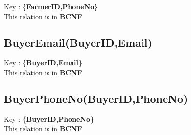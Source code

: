\documentclass{article}
\begin{document}
Key : \textbf{\{FarmerID,PhoneNo\}}\\
This relation is in \textbf{BCNF}
 
\subsection*{BuyerEmail(BuyerID,Email)}

Key : \textbf{\{BuyerID,Email\}}\\
This relation is in \textbf{BCNF}

 \subsection*{BuyerPhoneNo(BuyerID,PhoneNo)}
 
Key : \textbf{\{BuyerID,PhoneNo\}}\\
This relation is in \textbf{BCNF}
\end{document}
